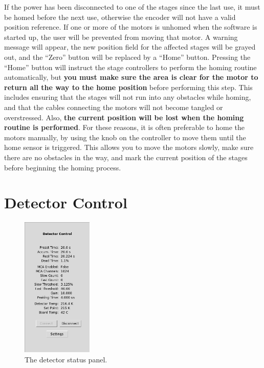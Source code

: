 If the power has been disconnected to one of the stages since the last use, it must be homed before the next use, otherwise the encoder will not have a valid position reference. If one or more of the motors is unhomed when the software is started up, the user will be prevented from moving that motor. A warning message will appear, the new position field for the affected stages will be grayed out, and the ``Zero'' button will be replaced by a ``Home'' button. Pressing the ``Home'' button will instruct the stage controllers to perform the homing routine automatically, but \textbf{you must make sure the area is clear for the motor to return all the way to the home position} before performing this step. This includes ensuring that the stages will not run into any obstacles while homing, and that the cables connecting the motors will not become tangled or overstressed. Also, \textbf{the current position will be lost when the homing routine is performed}. For these reasons, it is often preferable to home the motors manually, by using the knob on the controller to move them until the home sensor is triggered. This allows you to move the motors slowly, make sure there are no obstacles in the way, and mark the current position of the stages before beginning the homing process.


\section{Detector Control}

\begin{figure}
\centering
\includegraphics[width=0.3\textwidth]{detctl.png}
\caption{\label{fig:detctl} The detector status panel.}
\end{figure}

